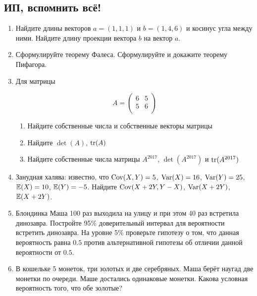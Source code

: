 \subsection{ИП, вспомнить всё!}

\begin{enumerate}
\item Найдите длины векторов $a=(1,1,1)$ и $b=(1,4,6)$ и косинус угла между ними. Найдите длину проекции вектора $b$ на вектор $a$.

\item Сформулируйте теорему Фалеса. Сформулируйте и докажите теорему Пифагора.


\item Для матрицы

\[
A=\begin{pmatrix}
6 & 5 \\
5 & 6 \\
\end{pmatrix}
\]

\begin{enumerate}
\item Найдите собственные числа и собственные векторы матрицы
\item Найдите $\det (A)$, $\operatorname{tr}(A)$
\item Найдите собственные числа матрицы $A^{2017}$, $\det (A^{2017})$ и $\operatorname{tr}(A^{2017})$
\end{enumerate}


\item Занудная халява: известно, что $\operatorname{Cov}(X, Y)=5$, $\operatorname{Var}(X)=16$, $\operatorname{Var}(Y)=25$, $\mathbb{E}(X)=10$, $\mathbb{E}(Y)=-5$.
Найдите $\operatorname{Cov}(X+2Y, Y-X)$, $\operatorname{Var}(X+2Y)$, $\mathbb{E}(X+2Y)$.

\item Блондинка Маша 100 раз выходила на улицу и при этом 40 раз встретила динозавра. Постройте 95\% доверительный интервал для вероятности встретить динозавра. На уровне 5\% проверьте гипотезу о том, что данная вероятность равна $0.5$ против альтернативной гипотезы об отличии данной вероятности от $0.5$.

\item В кошельке 5 монеток, три золотых и две серебряных. Маша берёт наугад две монетки по очереди. Маше достались одинаковые монетки. Какова условная вероятность того, что обе золотые?
\end{enumerate}



